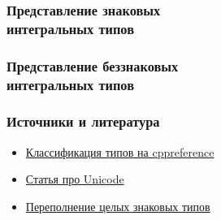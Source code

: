 \documentclass[compress, 8pt]{beamer}
\begin{document}
\begin{frame}[fragile]

    \frametitle{Представление знаковых \\ интегральных типов}

\end{frame}

\begin{frame}[fragile]

    \frametitle{Представление беззнаковых \\ интегральных типов}

\end{frame}

\begin{frame}

    \frametitle{Источники и литература}

    \begin{itemize}

        \item \href{https://en.cppreference.com/w/cpp/language/type}
            {Классификация типов на cppreference}
        \item \href{https://habr.com/ru/companies/wunderfund/articles/777850/}
            {Статья про Unicode}
        \item \href{https://github.com/Nekrolm/ubbook/blob/master/numeric/overflow.md}
            {Переполнение целых знаковых типов}

    \end{itemize}

\end{frame}
\end{document}
